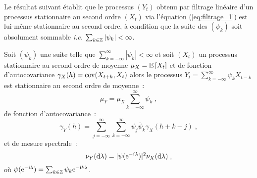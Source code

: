 Le r\'esultat suivant \'etablit que le processus $(Y_t)$ obtenu par filtrage
lin\'eaire d'un processus stationnaire au second ordre $(X_t)$ via
l'\'equation (\ref{eq:filtrage_1}) est
lui-m\^{e}me stationnaire au second ordre, \`a condition que la
suite des $(\psi_k)$ soit absolument sommable
\textit{i.e.} $\sum_{k\in\mathbb{Z}}|\psi_k|<\infty$.

\begin{theorem}
 \label{theo:filtragepassl_stat}
 Soit $(\psi_k)$ une suite
telle que $\sum_{k= - \infty}^\infty |\psi_k| < \infty$ et soit
$(X_{t})$ un processus stationnaire au second ordre de moyenne
$\mu_X= {\mathbb E}\left[ X_{t} \right]$ et de fonction d'autocovariance $\gamma_X(h)=
\mathrm{cov}(X_{t+h},X_{t})$ alors le processus $Y_{t} =
\sum_{k=-\infty}^\infty \psi_k X_{t-k}$ est stationnaire au second
ordre de moyenne~:
\begin{equation}
\label{eq:moyennefiltre}
 \mu_Y = \mu_X \sum_{k=-\infty}^\infty \psi_k\; ,
\end{equation}
de fonction d'autocovariance~:
\begin{equation}
\label{eq:facfiltrage}
 \gamma_Y(h)= \sum_{j=-\infty}^\infty
    \sum_{k=-\infty}^\infty \psi_j \bar{\psi}_k \gamma_X(h+k-j)\; ,
\end{equation}
et de mesure spectrale~:
\begin{equation}
\label{eq:dspfiltrage}
  \nu_Y(\mathrm{d}\lambda) = |\psi(\mathrm{e}^{-i\lambda})|^2 \nu_X(\mathrm{d}\lambda)\; ,
\end{equation}
o\`u $\psi(\mathrm{e}^{-\mathrm{i} \lambda}) = \sum_{k\in \mathbb{Z}} \psi_k \mathrm{e}^{-\mathrm{i} k \lambda}$.
\end{theorem}
